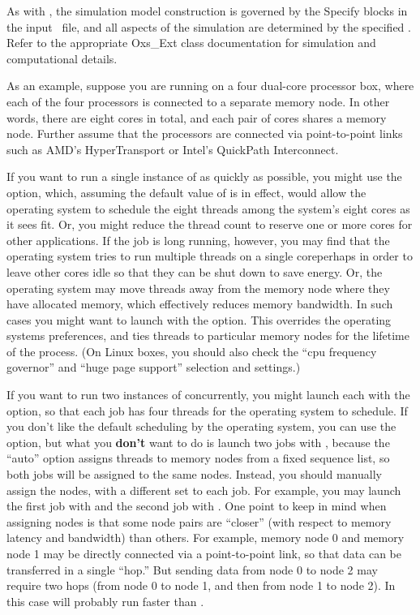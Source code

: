 As with , the simulation model construction is governed by
the Specify blocks in the input \MIF\ file, and all aspects of the
simulation are determined by the specified
.
Refer to the appropriate Oxs\_Ext class documentation for simulation and
computational details.

As an example, suppose you are running on a four dual-core processor
box, where each of the four processors is connected to a separate memory
node.  In other words, there are eight cores in total, and each pair of
cores shares a memory node.  Further assume that the processors are
connected via point-to-point links such as AMD's HyperTransport or
Intel's QuickPath Interconnect.

If you want to run a single instance of  as quickly as
possible, you might use the  option, which, assuming the
default value of  is in effect, would allow the
operating system to schedule the eight threads among the system's eight
cores as it sees fit.  Or, you might reduce the thread count to reserve
one or more cores for other applications.  If the job is long running,
however, you may find that the operating system tries to run multiple
threads on a single core\emdash perhaps in order to leave other cores idle so
that they can be shut down to save energy.  Or, the operating system may
move threads away from the memory node where they have allocated memory,
which effectively reduces memory bandwidth.  In such cases you might want
to launch  with the  option.  This
overrides the operating systems preferences, and ties threads to
particular memory nodes for the lifetime of the process.  (On Linux
boxes, you should also check the ``cpu frequency governor'' and ``huge page
support'' selection and settings.)

If you want to run two instances of  concurrently, you might
launch each with the  option, so that each job has four
threads for the operating system to schedule.  If you don't like the
default scheduling by the operating system, you can use the
 option, but what you \textbf{don't} want to do is launch
two jobs with , because the ``auto'' option assigns
threads to memory nodes from a fixed sequence list, so both jobs will be
assigned to the same nodes.  Instead, you should manually assign the
nodes, with a different set to each job.  For example, you may launch
the first job with  and the second job with
.  One point to keep in mind when assigning nodes is
that some node pairs are ``closer'' (with respect to memory latency and
bandwidth) than others.  For example, memory node 0 and memory node 1
may be directly connected via a point-to-point link, so that data can be
transferred in a single ``hop.''  But sending data from node 0 to node 2
may require two hops (from node 0 to node 1, and then from node 1 to
node 2).  In this case  will probably run faster than
.

